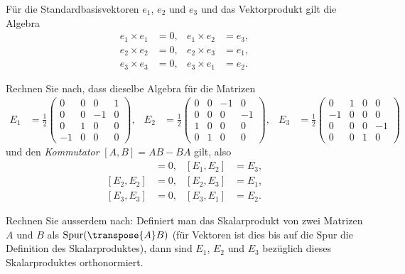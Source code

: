 Für die Standardbasisvektoren $e_1$, $e_2$ und $e_3$ und das Vektorprodukt
gilt die Algebra
\begin{align*}
e_1\times e_1&=0,&
e_1\times e_2&=e_3,\\
e_2\times e_2&=0,&
e_2\times e_3&=e_1,\\
e_3\times e_3&=0,&
e_3\times e_1&=e_2.
\end{align*}
\begin{teilaufgaben}
\item
Rechnen Sie nach, dass dieselbe Algebra für die Matrizen
\begin{align*}
E_1&=\frac12\begin{pmatrix}
 0& 0& 0& 1\\
 0& 0&-1& 0\\
 0& 1& 0& 0\\
-1& 0& 0& 0
\end{pmatrix},
&
E_2&=\frac12\begin{pmatrix}
 0& 0&-1& 0\\
 0& 0& 0&-1\\
 1& 0& 0& 0\\
 0& 1& 0& 0
\end{pmatrix},
&
E_3&=\frac12\begin{pmatrix}
 0& 1& 0& 0\\
-1& 0& 0& 0\\
 0& 0& 0&-1\\
 0& 0& 1& 0
\end{pmatrix}
&
\end{align*}
und den {\em Kommutator} $[A,B]=AB-BA$ gilt, also
\begin{align*}
[E_1, E_1]&=0,&
[E_1, E_2]&=E_3,\\
[E_2, E_2]&=0,&
[E_2, E_3]&=E_1,\\
[E_3, E_3]&=0,&
[E_3, E_1]&=E_2.
\end{align*}
\item
Rechnen Sie ausserdem nach:
Definiert man das Skalarprodukt von zwei Matrizen $A$ und $B$ als
$\operatorname{Spur}(\transpose{A}B)$
(für Vektoren ist dies bis auf die Spur die Definition des Skalarproduktes),
dann sind $E_1$, $E_2$
und $E_3$ bezüglich dieses Skalarproduktes orthonormiert.
\end{teilaufgaben}


